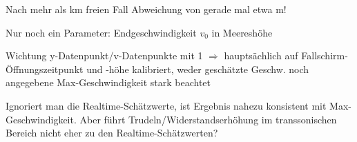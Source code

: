 \begin{landscape}
\begin{center}

Nach mehr als \unit[36]{km} freien Fall Abweichung von gerade mal
etwa \unit[50]{m}!

\newpage

\bi
\item Nur noch ein Parameter: Endgeschwindigkeit $v_0$ in Meeresh\"ohe
\item Wichtung y-Datenpunkt/v-Datenpunkte mit 1 $\Rightarrow$
  haupts\"achlich auf Fallschirm-\"Offnungszeitpunkt und -h\"ohe
  kalibriert, weder gesch\"atzte Geschw. noch angegebene
  Max-Geschwindigkeit stark beachtet
\ei
{}

\newpage
Ignoriert man die Realtime-Sch\"atzwerte, ist Ergebnis nahezu
konsistent mit Max-Geschwindigkeit. Aber f\"uhrt
Trudeln/Widerstandserh\"ohung im transsonischen Bereich nicht eher zu
den Realtime-Sch\"atzwerten?

\end{center}
\end{landscape}

